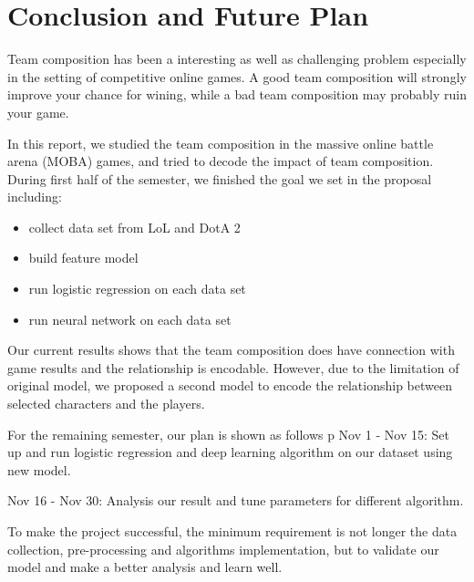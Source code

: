 \documentclass[conference]{IEEEtran}
\begin{document}
\section{Conclusion and Future Plan}

Team composition has been a interesting as well as challenging problem especially in the setting of competitive online games. A good team composition will strongly improve your chance for wining, while a bad team composition may probably ruin your game.

In this report, we studied the team composition in the massive online battle arena (MOBA) games, and tried to decode the impact of team composition.
During first half of the semester, we finished the goal we set in the proposal including:
\begin{itemize}
\item collect data set from LoL and DotA 2
\item build feature model
\item run logistic regression on each data set
\item run neural network on each data set
\end{itemize}

Our current results shows that the team composition does have connection with game results and the relationship is encodable. However, due to the limitation of original model, we proposed a second model to encode the relationship between selected characters and the players.

For the remaining semester, our plan is shown as follows
p
Nov 1 - Nov 15: Set up and run logistic regression and deep learning algorithm on our dataset using new model.

Nov 16 - Nov 30: Analysis our result and tune parameters for different algorithm.

To make the project successful, the minimum requirement is not longer the data collection, pre-processing and algorithms implementation, but to validate our model and make a better analysis and learn well.



%
%
\end{document}
